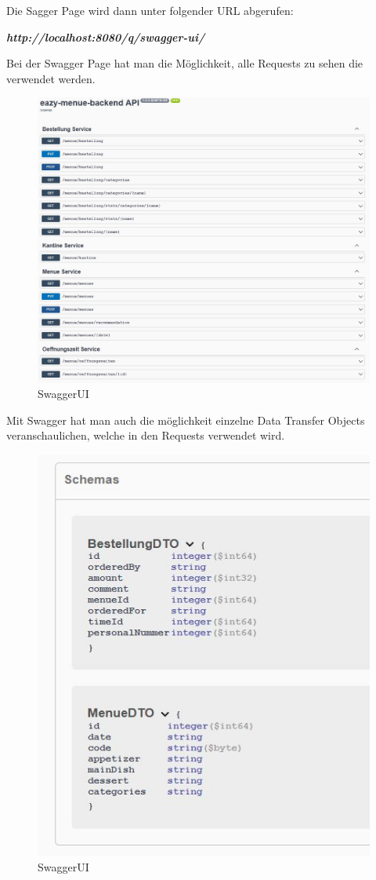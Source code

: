 Die Sagger Page wird dann unter folgender URL abgerufen: 

\textbf{\textit{http://localhost:8080/q/swagger-ui/ }}

Bei der Swagger Page hat man die Möglichkeit, alle Requests zu sehen die verwendet werden.

\begin{figure}[htp]
    \author{David Ignjatovic}
    \centering
    \includegraphics[scale=0.60]{pics/swagger.jpg}
    \caption{SwaggerUI}
    \label{fig:impl:swagger}
\end{figure}

Mit Swagger hat man auch die möglichkeit einzelne Data Transfer Objects veranschaulichen, welche in den Requests verwendet wird.

\begin{figure}[htp]
    \author{David Ignjatovic}
    \centering
    \includegraphics[scale=0.90]{pics/swagger-schema.jpg}
    \caption{SwaggerUI}
    \label{fig:impl:swagger-schema}
\end{figure}





